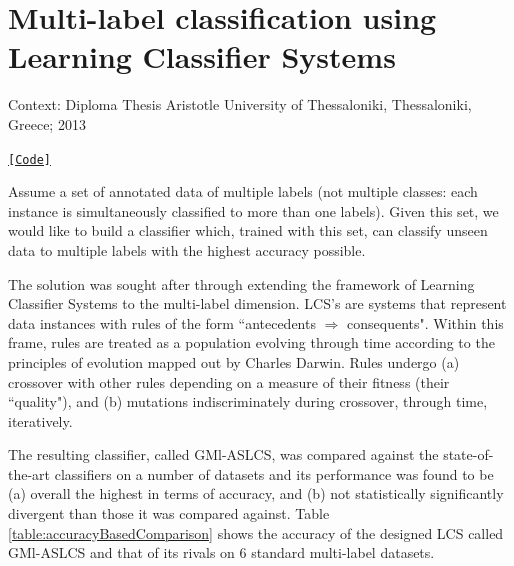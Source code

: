 \chapter{Multi-label classification using Learning Classifier Systems}

\noindent Context: Diploma Thesis
\noindent Aristotle University of Thessaloniki, Thessaloniki, Greece; 2013

\noindent \href{https://github.com/li9i/lcss}{\texttt{[Code]}}

\begin{problem}
Assume a set of annotated data of multiple labels (not
multiple classes: each instance is simultaneously classified to more than one
labels). Given this set, we would like to build a classifier which, trained with
this set, can classify unseen data to multiple labels with the highest accuracy
possible.
\end{problem}

The solution was sought after through extending the framework of Learning
Classifier Systems to the multi-label dimension. LCS's are systems that
represent data instances with rules of the form ``antecedents $\Rightarrow$
consequents". Within this frame, rules are treated as a population evolving
through time according to the principles of evolution mapped out by Charles
Darwin. Rules undergo (a) crossover with other rules depending on a measure of
their fitness (their ``quality"), and (b) mutations indiscriminately during
crossover, through time, iteratively.

The resulting classifier, called GMl-ASLCS, was compared against the
state-of-the-art classifiers on a number of datasets and its performance was
found to be (a) overall the highest in terms of accuracy, and (b) not
statistically significantly divergent than those it was compared against. Table
\ref{table:accuracyBasedComparison} shows the accuracy of the designed LCS
called GMl-ASLCS and that of its rivals on 6 standard multi-label datasets.

